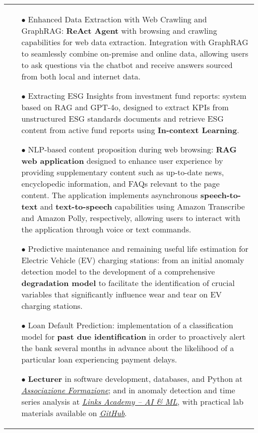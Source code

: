 \documentclass[11pt,a4paper,sans,english]{moderncv}
\makeatletter
\newcommand*{\mycvitem}[2][.25em]{%
	\vspace{-.25em}%
	\begin{tabular}{@{}p{\textwidth}@{}}%
		\small#2%
	\end{tabular}%
	\par\addvspace{-0.7em}}
\makeatother
\begin{document}
	\mycvitem{%
		\vspace*{-.2cm}
		\begin{itemize}
			\item[$\bullet$] Enhanced Data Extraction with Web Crawling and GraphRAG: \textbf{ReAct Agent} with browsing and crawling capabilities for web data extraction. Integration with GraphRAG to seamlessly combine on-premise and online data, allowing users to ask questions via the chatbot and receive answers sourced from both local and internet data.
			\item[$\bullet$] Extracting ESG Insights from investment fund reports: system based on RAG and GPT-4o, designed to extract KPIs from unstructured ESG standards documents and retrieve ESG content from active fund reports using \textbf{In-context Learning}.
			\item[$\bullet$] NLP-based content proposition during web browsing: \textbf{RAG web application} designed to enhance user experience by providing supplementary content such as up-to-date news, encyclopedic information, and FAQs relevant to the page content. The application implements asynchronous \textbf{speech-to-text} and \textbf{text-to-speech} capabilities using Amazon Transcribe and Amazon Polly, respectively, allowing users to interact with the application through voice or text commands.
			\item[$\bullet$] Predictive maintenance and remaining useful life estimation for Electric Vehicle (EV) charging stations: from an initial anomaly detection model to the development of a comprehensive \textbf{degradation model} to facilitate the identification of crucial variables that significantly influence wear and tear on EV charging stations.
			\item[$\bullet$] Loan Default Prediction: implementation of a classification model for \textbf{past due identification} in order to proactively alert the bank several months in advance about the likelihood of a particular loan experiencing payment delays.
			\item[$\bullet$] \textbf{Lecturer} in software development, databases, and Python at \href{https://www.associazioneformazione.it/formazione-professionale/ifts-tecnico-per-la-progettazione-e-lo-sviluppo-di-applicazioni-informatiche}{\textit{\underline{Associazione Formazione}}}; and in anomaly detection and time series analysis at \href{https://academy.linksmt.it/corso-di-formazione-post-laurea-artificial-intelligence-machine-learning/}{\textit{\underline{Links Academy – AI \& ML}}}, with practical lab materials available on \href{https://github.com/francesco-s/Links-Academy---Anomaly-Detection-Time-series-analysis}{\textit{\underline{GitHub}}}.
	\end{itemize}}
	\vspace*{.25cm}
	
\end{document}
